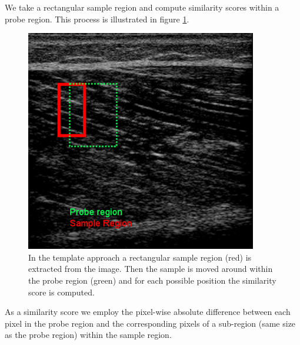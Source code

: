 \documentclass[10pt,twocolumn,letterpaper]{article}
\begin{document}
We take a rectangular sample region and compute similarity scores within a probe region. This process is illustrated in figure \ref{fig:templateApproach}. 

\begin{figure}
	\begin{center}		
		\includegraphics[width=1\linewidth]{img/templateApproach}
	\end{center}
	\caption{In the template approach a rectangular sample region (red) is extracted from the image. Then the sample is moved around within the probe region (green) and for each possible position the similarity score is computed.}
	\label{fig:templateApproach}
	
\end{figure}

As a similarity score we employ the pixel-wise absolute difference between each pixel in the probe region and the corresponding pixels of a sub-region (same size as the probe region) within the sample region.
\end{document}
